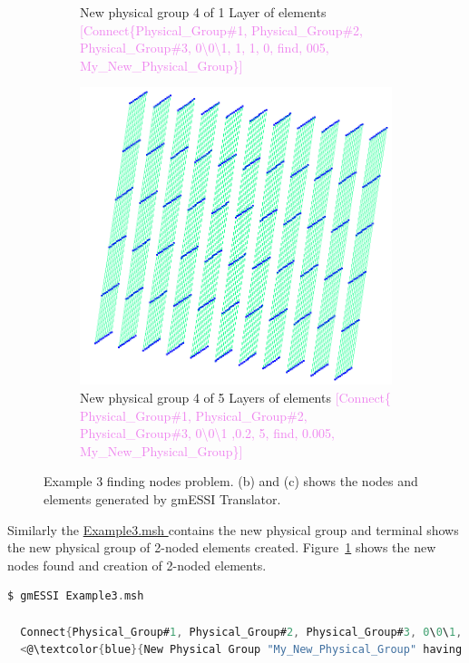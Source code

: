 \documentclass[11pt]{article}
\begin{document}
\begin{figure}[h]
\begin{subfigure}[b]{0.3\textwidth}
    \caption{New physical group 4 of 1 Layer of elements \textcolor{violet}{[Connect\{Physical\_Group\#1, Physical\_Group\#2, Physical\_Group\#3, 0\textbackslash0\textbackslash1, 1, 1, 0, find, 005, My_New_Physical_Group\}]}}
  \end{subfigure}\hfill
    \begin{subfigure}[b]{0.3\textwidth}
    \includegraphics[width=\textwidth]{Images/Example3-5layers.png}
    \caption{New physical group 4 of 5 Layers of elements \textcolor{violet}{[Connect\{ Physical\_Group\#1, Physical\_Group\#2, Physical\_Group\#3, 0\textbackslash0\textbackslash1 ,0.2, 5, find, 0.005, My_New_Physical_Group\}]}}
  \end{subfigure}
  \caption{\label{Example-3-Connect-Command}Example 3 finding nodes problem. (b)
  and (c) shows the nodes and elements generated by gmESSI Translator. }
\end{figure}

Similarly the \href{http://beta.sumeetsinha.in/gmESSI/Examples/Example3/Exampl
e3_ESSI_Simulation/Example3.msh}{ Example3.msh } contains the new physical
group and terminal shows the new physical group of 2-noded elements created.
Figure~\ref{Example-3-Connect-Command} shows the new nodes found and creation of
2-noded elements.

\begin{lstlisting}[language=C]
$ gmESSI Example3.msh

  Connect{Physical_Group#1, Physical_Group#2, Physical_Group#3, 0\0\1, 1, 1, find, 0.005, My_New_Physical_Group}  Found!!
  <@\textcolor{blue}{New Physical Group "My_New_Physical_Group" having id 4 consisting of 242 Nodes and 121 2-noded elements created }@>

\end{lstlisting}
\end{document}
